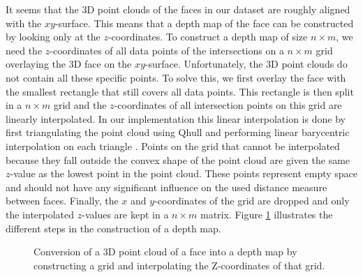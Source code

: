 \documentclass[]{article}
\begin{document}
It seems that the 3D point clouds of the faces in our dataset are roughly aligned with the $xy$-surface. This means that a depth map of the face can be constructed by looking only at the $z$-coordinates. To construct a depth map of size $n \times m$, we need the $z$-coordinates of all data points of the intersections on a $n \times m$ grid overlaying the 3D face on the $xy$-surface. Unfortunately, the 3D point clouds do not contain all these specific points. To solve this, we first overlay the face with the smallest rectangle that still covers all data points. This rectangle is then split in a  $n \times m$ grid and the $z$-coordinates of all intersection points on this grid are linearly interpolated. In our implementation this linear interpolation is done by first triangulating the point cloud using Qhull and performing linear barycentric interpolation on each triangle \cite{linearinerpolator2016}.
Points on the grid that cannot be interpolated because they fall outside the convex shape of the point cloud are given the same $z$-value as the lowest point in the point cloud. These points represent empty space and should not have any significant influence on the used distance measure between faces. Finally, the $x$ and $y$-coordinates of the grid are dropped and only the interpolated $z$-values are kept in a $n \times m$ matrix. Figure \ref{fig:depthmap-generation} illustrates the different steps in the construction of a depth map.
\begin{figure}
	\centering
	\caption{Conversion of a 3D point cloud of a face into a depth map by constructing a grid and interpolating the Z-coordinates of that grid.}
	\label{fig:depthmap-generation}
\end{figure}


\end{document}
